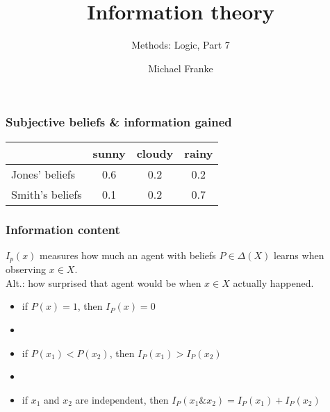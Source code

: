 \documentclass[fleqn,10pt,serif,xcolor=svgnames,xcolor=table,aspectratio=169,handout]{beamer}
\title{Information theory}
\subtitle{Methods: Logic, Part 7}
\author{Michael Franke}
\date{}
\begin{document}

\abovedisplayskip=3pt
\abovedisplayshortskip=3pt

\belowdisplayskip=3pt
\belowdisplayshortskip=3pt

\begin{frame}
  \maketitle
\end{frame}

\begin{frame}
  \frametitle{Subjective beliefs \& information gained}

  \begin{center}

    \begin{tabular}{lccc}
                      & sunny & cloudy & rainy \\ \midrule
      Jones' beliefs  & 0.6   & 0.2    & 0.2   \\
      Smith's beliefs & 0.1   & 0.2    & 0.7   \\
    \end{tabular}

  \end{center}

\end{frame}

\begin{frame}
  \frametitle{Information content}

  $I_{p}(x)$ measures how much an agent with beliefs $P \in \Delta(X)$ learns when observing $x \in X$.\\
  Alt.: how surprised that agent would be when $x \in X$ actually happened.

  \bigskip

  \bigskip

  \pause

  \begin{itemize}
    \item if $P(x) = 1$, then $I_{P}(x) = 0$
    \item[]
    \item if $P(x_{1}) < P(x_{2})$, then $I_{P}(x_{1}) > I_{P}(x_{2})$
    \item[]
    \item if $x_{1}$ and $x_{2}$ are independent, then $I_{P}(x_{1} \& x_{2}) = I_{P}(x_{1}) + I_{P}(x_{2})$
  \end{itemize}

\end{frame}
\end{document}
